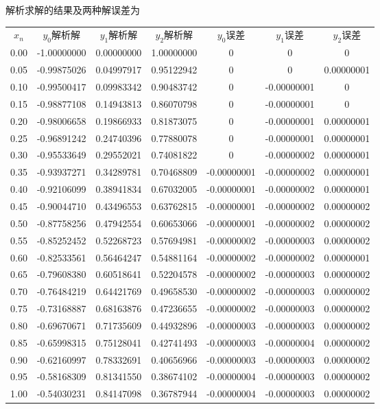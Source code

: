 解析求解的结果及两种解误差为
{\small
\begin{center}
\begin{tabular}{c|c|c|c|c|c|c}
$x_n$	&	$y_0$解析解	&	$y_1$解析解	&	$y_2$解析解	&	$y_0$误差	&	$y_1$误差	&	$y_2$误差	\\
0.00	&	-1.00000000	&	0.00000000	&	1.00000000	&	0	&	0	&	0	\\
0.05	&	-0.99875026	&	0.04997917	&	0.95122942	&	0	&	0	&	0.00000001	\\
0.10	&	-0.99500417	&	0.09983342	&	0.90483742	&	0	&	-0.00000001	&	0	\\
0.15	&	-0.98877108	&	0.14943813	&	0.86070798	&	0	&	-0.00000001	&	0	\\
0.20	&	-0.98006658	&	0.19866933	&	0.81873075	&	0	&	-0.00000001	&	0.00000001	\\
0.25	&	-0.96891242	&	0.24740396	&	0.77880078	&	0	&	-0.00000001	&	0.00000001	\\
0.30	&	-0.95533649	&	0.29552021	&	0.74081822	&	0	&	-0.00000002	&	0.00000001	\\
0.35	&	-0.93937271	&	0.34289781	&	0.70468809	&	-0.00000001	&	-0.00000002	&	0.00000001	\\
0.40	&	-0.92106099	&	0.38941834	&	0.67032005	&	-0.00000001	&	-0.00000002	&	0.00000001	\\
0.45	&	-0.90044710	&	0.43496553	&	0.63762815	&	-0.00000001	&	-0.00000002	&	0.00000002	\\
0.50	&	-0.87758256	&	0.47942554	&	0.60653066	&	-0.00000001	&	-0.00000002	&	0.00000002	\\
0.55	&	-0.85252452	&	0.52268723	&	0.57694981	&	-0.00000002	&	-0.00000003	&	0.00000002	\\
0.60	&	-0.82533561	&	0.56464247	&	0.54881164	&	-0.00000002	&	-0.00000002	&	0.00000001	\\
0.65	&	-0.79608380	&	0.60518641	&	0.52204578	&	-0.00000002	&	-0.00000003	&	0.00000002	\\
0.70	&	-0.76484219	&	0.64421769	&	0.49658530	&	-0.00000002	&	-0.00000003	&	0.00000002	\\
0.75	&	-0.73168887	&	0.68163876	&	0.47236655	&	-0.00000002	&	-0.00000003	&	0.00000002	\\
0.80	&	-0.69670671	&	0.71735609	&	0.44932896	&	-0.00000003	&	-0.00000003	&	0.00000002	\\
0.85	&	-0.65998315	&	0.75128041	&	0.42741493	&	-0.00000003	&	-0.00000004	&	0.00000002	\\
0.90	&	-0.62160997	&	0.78332691	&	0.40656966	&	-0.00000003	&	-0.00000003	&	0.00000002	\\
0.95	&	-0.58168309	&	0.81341550	&	0.38674102	&	-0.00000004	&	-0.00000003	&	0.00000002	\\
1.00	&	-0.54030231	&	0.84147098	&	0.36787944	&	-0.00000004	&	-0.00000003	&	0.00000002	\\
\end{tabular}
\end{center}}

